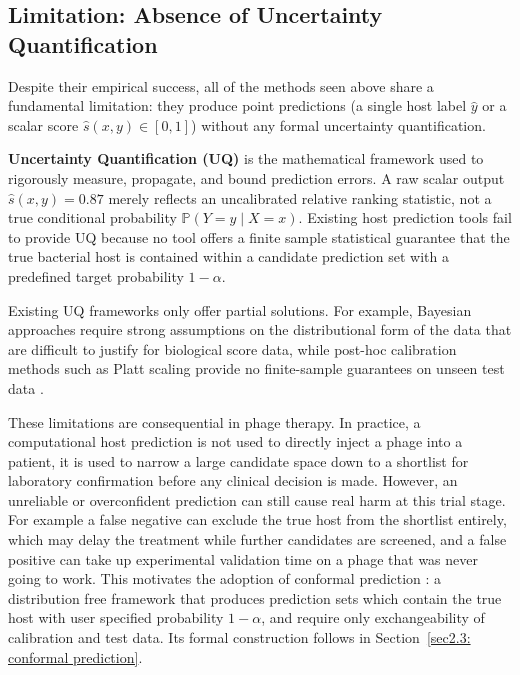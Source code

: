 
\subsection{Limitation: Absence of Uncertainty Quantification}
\label{sec2.2.3: limitations}
\noindent Despite their empirical success, all of the methods seen above share a fundamental limitation: they produce 
point predictions (a single host label $\hat{y}$ or a scalar score $\hat{s}(x,y) \in [0,1]$) without any formal 
uncertainty quantification. 

\textbf{Uncertainty Quantification (UQ)} is the mathematical framework used to rigorously measure, 
propagate, and bound prediction errors. A raw scalar output $\hat{s}(x,y) = 0.87$ merely reflects an uncalibrated 
relative ranking statistic, not a true conditional probability $\mathbb{P}(Y = y \mid X = x)$. Existing host prediction 
tools fail to provide UQ because no tool offers a finite sample statistical guarantee that the true bacterial host is 
contained within a candidate prediction set with a predefined target probability $1-\alpha$.

Existing UQ frameworks only offer partial solutions. For example, Bayesian approaches require strong assumptions on 
the distributional form of the data that are difficult to justify for biological score data, while post-hoc calibration 
methods such as Platt scaling provide no finite-sample guarantees on unseen test data \cite{angelopoulos2023conformal}. 


These limitations are consequential in phage therapy. In practice, a computational host prediction is not used to 
directly inject a phage into a patient, it is used to narrow a large candidate space down to a shortlist for laboratory 
confirmation before any clinical decision is made. However, an unreliable or overconfident prediction can still cause 
real harm at this trial stage. For example a false negative can exclude the true host from the shortlist entirely, 
which may delay the treatment while further candidates are screened, and a false positive can take up experimental 
validation time on a phage that was never going to work. This motivates the adoption of conformal prediction 
\cite{vovk2005algorithmic}: a distribution free framework that produces prediction sets which contain the true host with user 
specified probability $1-\alpha$, and require only exchangeability of calibration and test data. Its formal construction follows 
in Section~\ref{sec2.3: conformal prediction}.